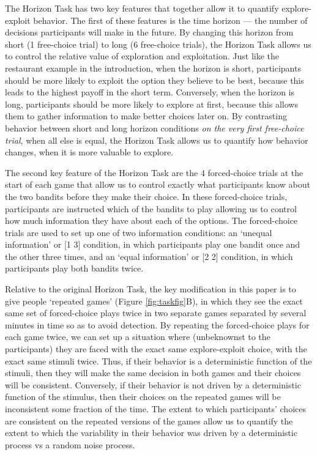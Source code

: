 \documentclass[12pt]{article}
\begin{document}
{	The Horizon Task has two key features that together allow it to quantify explore-exploit behavior. The first of these features is  the time horizon --- the number of decisions participants will make in the future. By changing this horizon from short (1 free-choice trial) to long (6 free-choice trials), the Horizon Task allows us to control the relative value of exploration and exploitation. Just like the restaurant example in the introduction, when the horizon is short, participants should be more likely to exploit the option they believe to be best, because this leads to the highest payoff in the short term. Conversely, when the horizon is long, participants should be more likely to explore at first, because this allows them to gather information to make better choices later on. By contrasting behavior between short and long horizon conditions {\it on the very first free-choice trial}, when all else is equal, the Horizon Task allows us to quantify how behavior changes, when it is more valuable to explore.
	
	The second key feature of the Horizon Task are the 4 forced-choice trials at the start of each game that allow us to control exactly what participants know about the two bandits before they make their choice. In these forced-choice trials, participants are instructed which of the bandits to play allowing us to control how much information they have about each of the options. The forced-choice trials are used to set up one of two information conditions: an `unequal information' or [1 3] condition, in which participants play one bandit once and the other three times, and an `equal information' or [2 2] condition, in which participants play both bandits twice.
	
	Relative to the original Horizon Task, the key modification in this paper is to give people `repeated games' (Figure \ref{fig:taskfig}B), in which they see the exact same set of forced-choice plays twice in two separate games separated by several minutes in time so as to avoid detection. By repeating the forced-choice plays for each game twice, we can set up a situation where (unbeknownst to the participants) they are faced with the exact same explore-exploit choice, with the exact same stimuli twice. Thus, if their behavior is a deterministic function of the stimuli, then they will make the same decision in both games and their choices will be consistent. Conversely, if their behavior is not driven by a deterministic function of the stimulus, then their choices on the repeated games will be inconsistent some fraction of the time. The extent to which participants' choices are consistent on the repeated versions of the games allow us to quantify the extent to which the variability in their behavior was driven by a deterministic process vs a random noise process.
	
}
\end{document}

